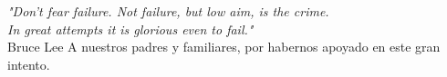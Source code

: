 \begin{dedication}
     \emph{"Don't fear failure. 
    Not failure, but low aim, is the crime.\\ 
    \noindent In great attempts it is glorious even to fail."\\
    }
    \hfill  Bruce Lee
    \newline
    \newline
    \newline
    \newline
    A nuestros padres y familiares, por habernos apoyado en este gran intento.

\end{dedication}
